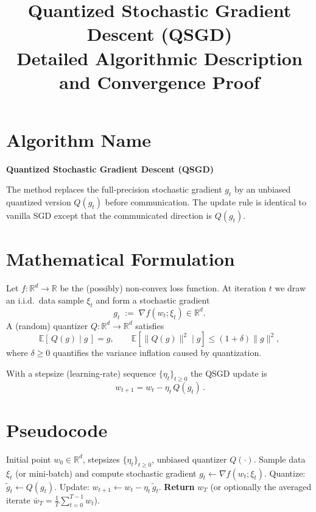 \documentclass{article}
\title{Quantized Stochastic Gradient Descent (QSGD) \\ Detailed Algorithmic Description and Convergence Proof}
\author{}
\date{}
\begin{document}
\maketitle

\tableofcontents
\newpage

\section*{Algorithm Name}
\textbf{Quantized Stochastic Gradient Descent (QSGD)}  

The method replaces the full‑precision stochastic gradient $g_t$ by an
unbiased quantized version $Q(g_t)$ before communication.  The update rule
is identical to vanilla SGD except that the communicated direction is
$Q(g_t)$.

\section*{Mathematical Formulation}
Let $f:\mathbb{R}^d\rightarrow\mathbb{R}$ be the (possibly) non‑convex loss
function.  At iteration $t$ we draw an i.i.d.\ data sample $\xi_t$ and form a
stochastic gradient
\[
g_t\;:=\;\nabla f(w_t;\xi_t)\in\mathbb{R}^d .
\]
A (random) quantizer $Q:\mathbb{R}^d\rightarrow\mathbb{R}^d$ satisfies
\[
\mathbb{E}\!\left[\,Q(g)\mid g\,\right]=g,\qquad
\mathbb{E}\!\left[\|Q(g)\|^2\mid g\right]\le (1+\delta)\|g\|^2,
\tag{1}
\]
where $\delta\ge 0$ quantifies the variance inflation caused by quantization.

With a stepsize (learning‑rate) sequence $\{\eta_t\}_{t\ge0}$ the QSGD update is
\[
\boxed{\,w_{t+1}=w_t-\eta_t\,Q(g_t)\,}.
\tag{2}
\]

\section*{Pseudocode}
\begin{algorithm}[H]
\caption{Quantized Stochastic Gradient Descent}
\begin{algorithmic}[1]
\Require Initial point $w_0\in\mathbb{R}^d$, stepsizes $\{\eta_t\}_{t\ge0}$,
          unbiased quantizer $Q(\cdot)$.
    \State Sample data $\xi_t$ (or mini‑batch) and compute stochastic gradient
          $g_t\gets \nabla f(w_t;\xi_t)$.
    \State Quantize: $\tilde g_t\gets Q(g_t)$.
    \State Update: $w_{t+1}\gets w_t-\eta_t\,\tilde g_t$.
\EndFor
\State \textbf{Return} $w_T$ (or optionally the averaged iterate
        $\bar w_T=\frac1T\sum_{t=0}^{T-1}w_t$).
\end{algorithmic}
\end{algorithm}
\end{document}
